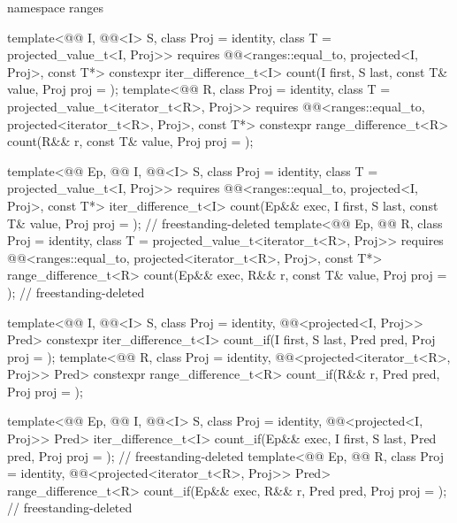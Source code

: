 \begin{codeblock}
{  namespace ranges {
    template<@@ I, @@<I> S, class Proj = identity,
             class T = projected_value_t<I, Proj>>
      requires @@<ranges::equal_to, projected<I, Proj>, const T*>
      constexpr iter_difference_t<I>
        count(I first, S last, const T& value, Proj proj = {});
    template<@@ R, class Proj = identity,
             class T = projected_value_t<iterator_t<R>, Proj>>
      requires @@<ranges::equal_to,
                                         projected<iterator_t<R>, Proj>, const T*>
      constexpr range_difference_t<R>
        count(R&& r, const T& value, Proj proj = {});

    template<@@ Ep, @@ I, @@<I> S,
             class Proj = identity, class T = projected_value_t<I, Proj>>
      requires @@<ranges::equal_to, projected<I, Proj>, const T*>
      iter_difference_t<I>
        count(Ep&& exec, I first, S last, const T& value, Proj proj = {});  // freestanding-deleted
    template<@@ Ep, @@ R, class Proj = identity,
             class T = projected_value_t<iterator_t<R>, Proj>>
      requires @@<ranges::equal_to,
                                         projected<iterator_t<R>, Proj>, const T*>
      range_difference_t<R>
        count(Ep&& exec, R&& r, const T& value, Proj proj = {});            // freestanding-deleted

    template<@@ I, @@<I> S, class Proj = identity,
             @@<projected<I, Proj>> Pred>
      constexpr iter_difference_t<I>
        count_if(I first, S last, Pred pred, Proj proj = {});
    template<@@ R, class Proj = identity,
             @@<projected<iterator_t<R>, Proj>> Pred>
      constexpr range_difference_t<R>
        count_if(R&& r, Pred pred, Proj proj = {});

    template<@@ Ep, @@ I, @@<I> S,
             class Proj = identity, @@<projected<I, Proj>> Pred>
      iter_difference_t<I>
        count_if(Ep&& exec, I first, S last, Pred pred, Proj proj = {});    // freestanding-deleted
    template<@@ Ep, @@ R, class Proj = identity,
             @@<projected<iterator_t<R>, Proj>> Pred>
      range_difference_t<R>
        count_if(Ep&& exec, R&& r, Pred pred, Proj proj = {});              // freestanding-deleted
  }

}
\end{codeblock}
